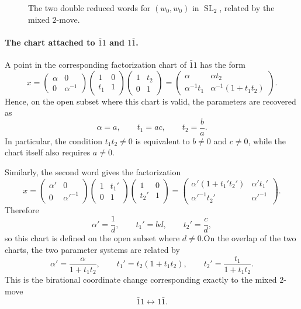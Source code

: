 \documentclass[12pt]{amsart}
\newcommand{\SL}{\operatorname{SL}}
\theoremstyle{plain}
\theoremstyle{definition}
\theoremstyle{remark}
\begin{document}
\begin{figure}[ht]
\centering
{}
\caption{\footnotesize {The two double reduced words for $(w_0,w_0)$ in $\SL_2$, related by the mixed $2$-move.}}
\label{fig:sl2-word-graph}
\end{figure}

\paragraph{\bf The chart attached to $\bar{1}1$ and $1\bar{1}$.}
A point in the corresponding factorization chart of $\bar{1}1$ has the form
\[
x=
\begin{pmatrix}\alpha&0\\0&\alpha^{-1}\end{pmatrix}
\begin{pmatrix}1&0\\ t_1&1\end{pmatrix}
\begin{pmatrix}1&t_2\\0&1\end{pmatrix}
=
\begin{pmatrix}
\alpha & \alpha t_2\\
\alpha^{-1}t_1 & \alpha^{-1}(1+t_1t_2)
\end{pmatrix}.
\]
Hence, on the open subset where this chart is valid, the parameters are recovered as
\[
\alpha=a,\qquad
t_1=ac,\qquad
t_2=\frac{b}{a}.
\]
In particular, the condition $t_1t_2\neq 0$ is equivalent to $b\neq 0$ and $c\neq 0$, while the chart itself also requires $a\neq 0$.

Similarly, the second word gives the factorization
\[
x=
\begin{pmatrix}\alpha'&0\\0&{\alpha'}^{-1}\end{pmatrix}
\begin{pmatrix}1&t_1'\\0&1\end{pmatrix}
\begin{pmatrix}1&0\\ t_2'&1\end{pmatrix}
=
\begin{pmatrix}
\alpha'(1+t_1't_2') & \alpha' t_1'\\
{\alpha'}^{-1} t_2' & {\alpha'}^{-1}
\end{pmatrix}.
\]
Therefore
\[
\alpha'=\frac{1}{d},\qquad
t_1'=bd,\qquad
t_2'=\frac{c}{d},
\]
so this chart is defined on the open subset where $d\neq 0$.On the overlap of the two charts, the two parameter systems are related by
\[
\alpha'=\frac{\alpha}{1+t_1t_2},\qquad
t_1'=t_2(1+t_1t_2),\qquad
t_2'=\frac{t_1}{1+t_1t_2}.
\]
This is the birational coordinate change corresponding exactly to the mixed $2$-move
\[
\bar{1}1 \longleftrightarrow 1\bar{1}.
\]
\end{document}

